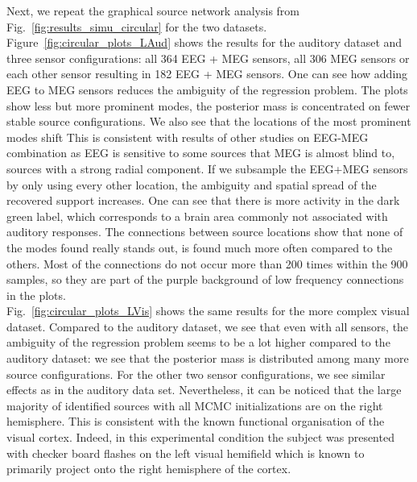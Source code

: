 Next, we repeat the graphical source network analysis from Fig.~\ref{fig:results_simu_circular} for the two datasets. Figure~\ref{fig:circular_plots_LAud} shows the results for the auditory dataset and three sensor configurations: all 364 EEG + MEG sensors, all 306 MEG sensors or each other sensor resulting in 182 EEG + MEG sensors. One can see how adding EEG to MEG sensors reduces the ambiguity of the regression problem. The plots show less but more prominent modes, \ie the posterior mass is concentrated on fewer stable source configurations. We also see that the locations of the most prominent modes shift
This is consistent with results of other studies on EEG-MEG combination \cite{MoStBrHa08,Lu14,AyVoKuHeKuGaHaWeKeRaWoHe14} as EEG is sensitive to some sources that MEG is almost blind to, \eg sources with a strong radial component. If we subsample the EEG+MEG sensors by only using every other location, the ambiguity and spatial spread of the recovered support increases. One can see that there is more activity in the dark green label, which corresponds to a brain area commonly not associated with auditory responses.%
The connections between source locations show that none of the modes found really stands out, \ie is found much more often compared to the others. Most of the connections do not occur more than 200 times within the 900 samples, so they are part of the purple background of low frequency connections in the plots.\\
Fig.~\ref{fig:circular_plots_LVis} shows the same results for the more complex visual dataset. Compared to the auditory dataset, we see that even with all sensors, the ambiguity of the regression problem seems to be a lot higher compared to the auditory dataset: we see that the posterior mass is distributed among many more source configurations. For the other two sensor configurations, we see similar effects as in the auditory data set. Nevertheless, it can be noticed that the large majority of identified sources with all MCMC initializations are on the right hemisphere. This is consistent with the known functional organisation of the visual cortex. Indeed, in this experimental condition the subject was presented with checker board flashes on the left visual hemifield which is known to primarily project onto the right hemisphere of the cortex.


